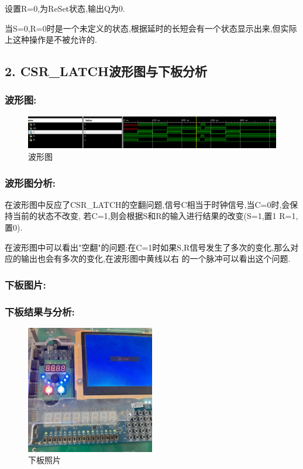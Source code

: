 \documentclass{article}
\begin{document}
设置R=0,为ReSet状态,输出Q为0.

当S=0,R=0时是一个未定义的状态,根据延时的长短会有一个状态显示出来,但实际上这种操作是不被允许的.



\subsection*{2. CSR\_LATCH波形图与下板分析}

\subsubsection*{波形图:}
    \begin{figure}[H]
    \centering
    \includegraphics[width=1\textwidth]{lab9p/2.png}
    \caption{\label{Lab9}波形图}
    \end{figure}
\subsubsection*{波形图分析:}
在波形图中反应了CSR\_LATCH的空翻问题,信号C相当于时钟信号,当C=0时,会保持当前的状态不改变,
若C=1,则会根据S和R的输入进行结果的改变(S=1,置1 R=1,置0).

在波形图中可以看出"空翻"的问题:在C=1时如果S,R信号发生了多次的变化,那么对应的输出也会有多次的变化,在波形图中黄线以右
的一个脉冲可以看出这个问题.

\subsubsection*{下板图片:}
\subsubsection*{下板结果与分析:}
    \begin{figure}[H]
    \centering
    \includegraphics[width=0.5\textwidth]{lab9p/21.jpg}
    \caption{\label{Lab9}下板照片}
    \end{figure}
\end{document}
